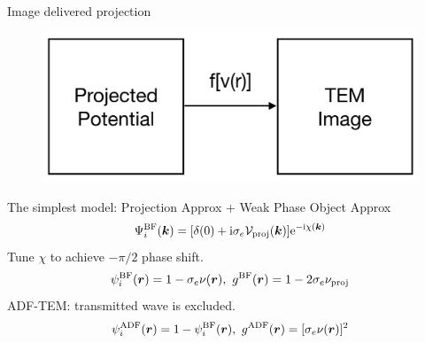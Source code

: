 \documentclass[slidestop,compress,12pt]{beamer}
\newcommand{\im}{\mathrm{i}}
\newcommand{\ee}{\mathrm{e}}
\begin{document}
\begin{frame}{Image delivered projection}
    \vspace{-0.5cm}
    \begin{figure}
        \includegraphics[scale=0.2]{imgs/TEM_black_box.png}
    \end{figure}
    \vspace{-0.5cm}
    The simplest model: Projection Approx + Weak Phase Object Approx
    \begin{equation}
            \Psi_{i}^{\text{BF}}(\bm{k}) = [\delta(0) + \im\sigma_e \mathcal{V}_{\text{proj}}(\bm{k})] \ee^{-\im \chi (\bm{k})} \notag 
    \end{equation}
    Tune $\chi$ to achieve $-\pi/2$ phase shift.
    \begin{equation}
        \psi^{\text{BF}}_i (\bm{r}) = 1-\sigma_e \nu(\bm{r}) ,\ 
        g^{\text{BF}}(\bm{r}) = 1-2\sigma_e\nu_{\text{proj}} \notag
    \end{equation}
    ADF-TEM: transmitted wave is excluded.
    \begin{equation}
        \psi^{\text{ADF}}_i(\bm{r}) = 1 - \psi^{\text{BF}}_i(\bm{r}) ,\ 
        g^{\text{ADF}}(\bm{r}) = [\sigma_e \nu(\bm{r})]^2 \notag
    \end{equation}
\end{frame}
\end{document}
